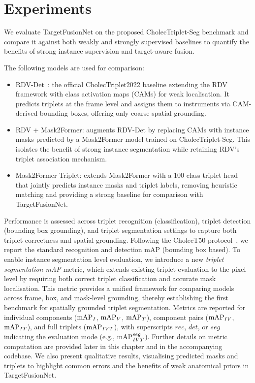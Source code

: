 \section{Experiments}\label{sec:experiments}
We evaluate TargetFusionNet on the proposed CholecTriplet-Seg benchmark and compare it against both weakly and strongly supervised baselines to quantify the benefits of strong instance supervision and target-aware fusion.  

The following models are used for comparison:
\begin{itemize}
    \item RDV-Det~\cite{nwoye2023cholectriplet2022}: the official CholecTriplet2022 baseline extending the RDV framework with class activation maps (CAMs) for weak localisation. It predicts triplets at the frame level and assigns them to instruments via CAM-derived bounding boxes, offering only coarse spatial grounding.  
    \item RDV + Mask2Former: augments RDV-Det by replacing CAMs with instance masks predicted by a Mask2Former model trained on CholecTriplet-Seg. This isolates the benefit of strong instance segmentation while retaining RDV’s triplet association mechanism.  
    \item Mask2Former-Triplet: extends Mask2Former with a 100-class triplet head that jointly predicts instance masks and triplet labels, removing heuristic matching and providing a strong baseline for comparison with TargetFusionNet.  
\end{itemize}


Performance is assessed across triplet recognition (classification), triplet detection (bounding box grounding), and triplet segmentation settings to capture both triplet correctness and spatial grounding. Following the CholecT50 protocol~\cite{nwoye2023datasplitsmetricsmethod}, we report the standard recognition and detection mAP (bounding box based). 
%
To enable instance segmentation level evaluation, we introduce a new \emph{triplet segmentation mAP} metric, which extends existing triplet evaluation to the pixel level by requiring both correct triplet classification and accurate mask localisation. This metric provides a unified framework for comparing models across frame, box, and mask-level grounding, thereby establishing the first benchmark for spatially grounded triplet segmentation.
%
Metrics are reported for individual components ($\textrm{mAP}_I$, $\textrm{mAP}_V$, $\textrm{mAP}_T$), component pairs ($\textrm{mAP}_{IV}$, $\textrm{mAP}_{IT}$), and full triplets ($\textrm{mAP}_{IVT}$), with superscripts $rec$, $det$, or $seg$ indicating the evaluation mode (e.g., $\textrm{mAP}_{IVT}^{seg}$). Further details on metric computation are provided later in this chapter and in the accompanying codebase.
%
We also present qualitative results, visualising predicted masks and triplets to highlight common errors and the benefits of weak anatomical priors in TargetFusionNet.



